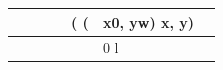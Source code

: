 \begin{tabular}{lllllll}
\toprule
 &  &  &  & ( ( & x0, yw) x, y) &  \\
\midrule
 &  &  &  &  & 0 l &  \\
\bottomrule
\end{tabular}
